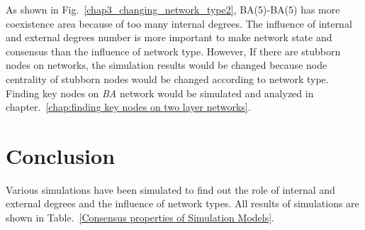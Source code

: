 As shown in Fig.~\ref{chap3_changing_network_type2}, BA(5)-BA(5) has more coexistence area because of too many internal degrees. The influence of internal and external degrees number is more important to make network state and consensus than the influence of network type. However, If there are stubborn nodes on networks, the simulation results would be changed because node centrality of stubborn nodes would be changed according to network type. Finding key nodes on \textit{BA} network would be simulated and analyzed in chapter.~\ref{chap:finding key nodes on two layer networks}.

\section{Conclusion}
Various simulations have been simulated to find out the role of internal and external degrees and the influence of network types. All results of simulations are shown in Table.~\ref{Consensus properties of Simulation Models}. 
